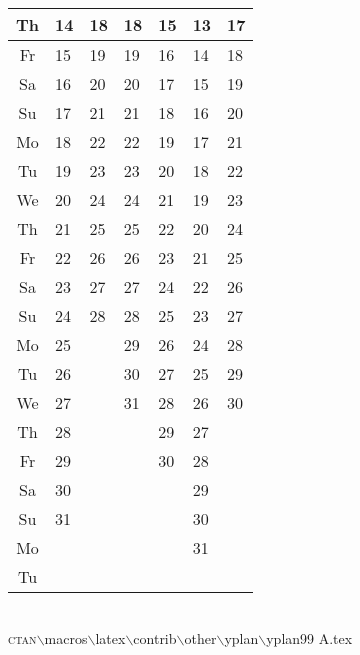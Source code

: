 \documentclass[a4paper]{article}
\newcommand{\datestrut}{\rule{0pt}{12pt}}
\begin{document}
\begin{table}
\begin{tabular}{|c||p{2.5cm}|p{2.5cm}|p{2.5cm}|p{2.5cm}|p{2.5cm}|p{2.5cm}|}
\hline
\datestrut Th & 14  &18   & 18  & 15  & 13    & 17    \\
\hline
\datestrut Fr & 15  &19   & 19  & 16  & 14    & 18    \\
\hline
\datestrut Sa & 16  &20   & 20  & 17  & 15    & 19    \\
\hline
\datestrut Su & 17  &21   & 21  & 18  & 16    & 20    \\
\hline \hline
\datestrut Mo & 18  &22   & 22  & 19  & 17    & 21    \\
\hline
\datestrut Tu & 19  &23   & 23  & 20  & 18    & 22    \\
\hline
\datestrut We & 20  &24   & 24  & 21  & 19    & 23    \\
\hline
\datestrut Th & 21  &25   & 25  & 22  & 20    & 24    \\
\hline
\datestrut Fr & 22  &26   & 26  & 23  & 21    & 25    \\
\hline
\datestrut Sa & 23  &27   & 27  & 24  & 22    & 26    \\
\hline
\datestrut Su & 24  &28   & 28  & 25  & 23    & 27    \\
\hline \hline
\datestrut Mo & 25  &     & 29  & 26  & 24    & 28    \\
\cline{1-2}\cline{4-7}
\datestrut Tu & 26  &     & 30  & 27  & 25    & 29    \\
\cline{1-2}\cline{4-7}
\datestrut We & 27  &     & 31  & 28  & 26    & 30    \\
\cline{1-2}\cline{4-7}
\datestrut Th & 28  &     &     & 29  & 27    &       \\
\cline{1-2}\cline{5-6}
\datestrut Fr & 29  &     &     & 30  & 28    &       \\
\cline{1-2}\cline{5-6}
\datestrut Sa & 30  &     &     &     & 29    &       \\
\cline{1-2}\cline{6-6}
\datestrut Su & 31  &     &     &     & 30    &       \\
\hline \hline
\datestrut Mo &     &     &     &     & 31    &       \\
\cline{1-1}\cline{6-6}
\datestrut Tu &     &     &     &     &       &       \\
\hline
\end{tabular}
{\ } \\
\newcommand{\bs}{$\backslash$}
\textsc{ctan}{\bs}macros{\bs}latex{\bs}contrib{\bs}other{\bs}yplan{\bs}yplan99
A.tex%
\end{table}
\end{document}
